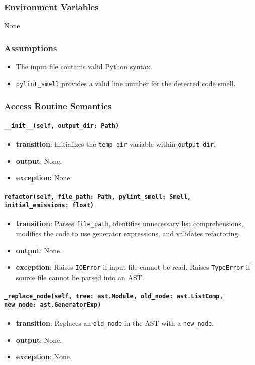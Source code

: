 \documentclass[12pt, titlepage]{article}
\begin{document}
\subsubsection{Environment Variables}
None

\subsubsection{Assumptions}
\begin{itemize}
  \item The input file contains valid Python syntax.
  \item \texttt{pylint\_smell} provides a valid line number for the detected code smell.
\end{itemize}

\subsubsection{Access Routine Semantics}

\paragraph{\texttt{\_\_init\_\_(self, output\_dir: Path)}}
\begin{itemize}
  \item \textbf{transition}: Initializes the \texttt{temp\_dir} variable within \texttt{output\_dir}.
  \item \textbf{output}: None.
  \item \textbf{exception:} None.
\end{itemize}

\paragraph{\texttt{refactor(self, file\_path: Path, pylint\_smell: Smell, initial\_emissions: float)}}
\begin{itemize}
  \item \textbf{transition}: Parses \texttt{file\_path}, identifies unnecessary list comprehensions, modifies the code to use generator expressions, and validates refactoring.
  \item \textbf{output}: None.
  \item \textbf{exception}: Raises \texttt{IOError} if input file cannot be read. Raises \texttt{TypeError} if source file cannot be parsed into an AST.
\end{itemize}

\paragraph{\texttt{\_replace\_node(self, tree: ast.Module, old\_node: ast.ListComp, new\_node: ast.GeneratorExp)}}
\begin{itemize}
  \item \textbf{transition}: Replaces an \texttt{old\_node} in the AST with a \texttt{new\_node}.
  \item \textbf{output}: None.
  \item \textbf{exception}: None.
\end{itemize}
\end{document}
